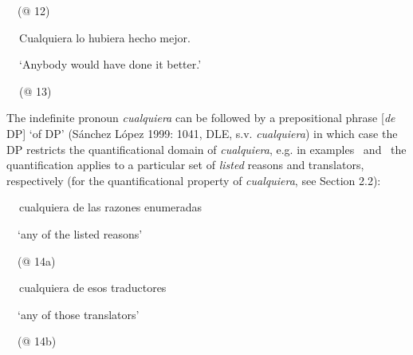 \begin{styleStandard}
\ \ (@ 12)
\end{styleStandard}

\begin{styleStandard}
\textbf{\ \ }Cualquiera lo hubiera hecho mejor. 
\end{styleStandard}

\begin{styleStandard}
\textbf{\ \ }‘Anybody would have done it better.’
\end{styleStandard}

\begin{styleStandard}
\textbf{\ \ }(@ 13)
\end{styleStandard}

\begin{styleStandard}
The indefinite pronoun \textit{cualquiera} can be followed by a prepositional phrase [\textit{de }DP] ‘of DP’ (Sánchez López 1999: 1041, DLE, s.v. \textit{cualquiera}) in which case the DP restricts the quantificational domain of \textit{cualquiera}, e.g. in examples \ and \ the quantification applies to a particular set of\textit{ listed }reasons and translators, respectively (for the quantificational property of \textit{cualquiera}, see Section 2.2):
\end{styleStandard}

\begin{styleStandard}
\label{bkm:Ref72400832}\textbf{\ \ }cualquiera de las razones enumeradas
\end{styleStandard}

\begin{styleStandard}
\ \ ‘any of the listed reasons’
\end{styleStandard}

\begin{styleStandard}
\ \ (@ 14a)
\end{styleStandard}

\begin{styleStandard}
\label{bkm:Ref533953098}\textbf{\ \ }cualquiera de esos traductores
\end{styleStandard}

\begin{styleStandard}
\ \ ‘any of those translators’
\end{styleStandard}

\begin{styleStandard}
\ \ (@ 14b)
\end{styleStandard}

